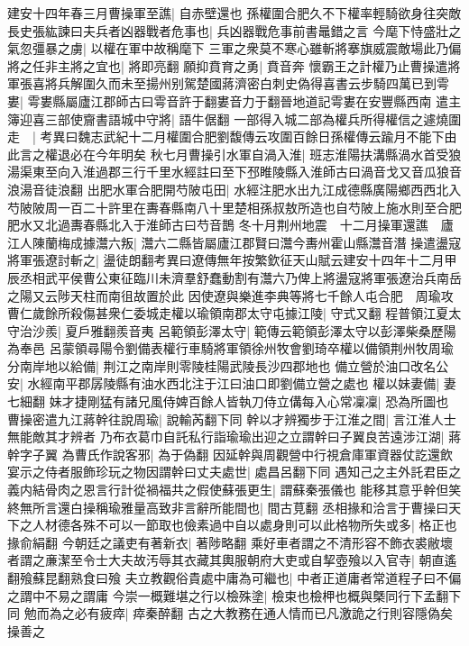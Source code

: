 建安十四年春三月曹操軍至譙|{
	自赤壁還也}
孫權圍合肥久不下權率輕騎欲身往突敵長史張紘諫曰夫兵者凶器戰者危事也|{
	兵凶器戰危事前書鼂錯之言}
今麾下恃盛壯之氣忽彊暴之虜|{
	以權在軍中故稱麾下}
三軍之衆莫不寒心雖斬將搴旗威震敵場此乃偏將之任非主將之宜也|{
	將即亮翻}
願抑賁育之勇|{
	賁音奔}
懷霸王之計權乃止曹操遣將軍張喜將兵解圍久而未至揚州别駕楚國蔣濟密白刺史偽得喜書云步騎四萬已到雩婁|{
	雩婁縣屬廬江郡師古曰雩音許于翻婁音力于翻晉地道記雩婁在安豐縣西南}
遣主簿迎喜三部使齎書語城中守將|{
	語牛倨翻}
一部得入城二部為權兵所得權信之遽燒圍走　|{
	考異曰魏志武紀十二月權圍合肥劉馥傳云攻圍百餘日孫權傳云踰月不能下由此言之權退必在今年明矣}
秋七月曹操引水軍自渦入淮|{
	班志淮陽扶溝縣渦水首受狼湯渠東至向入淮過郡三行千里水經註曰至下邳睢陵縣入淮師古曰渦音戈又音瓜狼音浪湯音徒浪翻}
出肥水軍合肥開芍陂屯田|{
	水經注肥水出九江成德縣廣陽鄉西西北入芍陂陂周一百二十許里在夀春縣南八十里楚相孫叔敖所造也自芍陂上施水則至合肥肥水又北過夀春縣北入于淮師古曰芍音鵲}
冬十月荆州地震　十二月操軍還譙　廬江人陳蘭梅成據灊六叛|{
	灊六二縣皆屬廬江郡賢曰灊今夀州霍山縣灊音潛}
操遣盪寇將軍張遼討斬之|{
	盪徒朗翻考異曰遼傳無年按繁欽征天山賦云建安十四年十二月甲辰丞相武平侯曹公東征臨川未濟羣舒蠢動割有灊六乃俾上將盪寇將軍張遼治兵南岳之陽又云陟天柱而南徂故置於此}
因使遼與樂進李典等將七千餘人屯合肥　周瑜攻曹仁歲餘所殺傷甚衆仁委城走權以瑜領南郡太守屯據江陵|{
	守式又翻}
程普領江夏太守治沙羨|{
	夏戶雅翻羨音夷}
呂範領彭澤太守|{
	範傳云範領彭澤太守以彭澤柴桑歷陽為奉邑}
呂蒙領尋陽令劉備表權行車騎將軍領徐州牧會劉琦卒權以備領荆州牧周瑜分南岸地以給備|{
	荆江之南岸則零陵桂陽武陵長沙四郡地也}
備立營於油口改名公安|{
	水經南平郡孱陵縣有油水西北注于江曰油口即劉備立營之處也}
權以妹妻備|{
	妻七細翻}
妹才捷剛猛有諸兄風侍婢百餘人皆執刀侍立傋每入心常凜凜|{
	恐為所圖也}
曹操密遣九江蔣幹往說周瑜|{
	說輸芮翻下同}
幹以才辨獨步于江淮之間|{
	言江淮人士無能敵其才辨者}
乃布衣葛巾自託私行詣瑜瑜出迎之立謂幹曰子翼良苦遠涉江湖|{
	蔣幹字子翼}
為曹氏作說客邪|{
	為于偽翻}
因延幹與周觀營中行視倉庫軍資器仗訖還飲宴示之侍者服飾珍玩之物因謂幹曰丈夫處世|{
	處昌呂翻下同}
遇知己之主外託君臣之義内結骨肉之恩言行計從禍福共之假使蘇張更生|{
	謂蘇秦張儀也}
能移其意乎幹但笑終無所言還白操稱瑜雅量高致非言辭所能間也|{
	間古莧翻}
丞相掾和洽言于曹操曰天下之人材德各殊不可以一節取也儉素過中自以處身則可以此格物所失或多|{
	格正也掾俞絹翻}
今朝廷之議吏有著新衣|{
	著陟略翻}
乘好車者謂之不清形容不飾衣裘敝壞者謂之亷潔至令士大夫故汚辱其衣藏其輿服朝府大吏或自挈壺飱以入官寺|{
	朝直遙翻飱蘇昆翻熟食曰飱}
夫立教觀俗貴處中庸為可繼也|{
	中者正道庸者常道程子曰不偏之謂中不易之謂庸}
今崇一概難堪之行以檢殊塗|{
	檢束也檢柙也概與槩同行下孟翻下同}
勉而為之必有疲瘁|{
	瘁秦醉翻}
古之大教務在通人情而已凡激詭之行則容隱偽矣操善之

